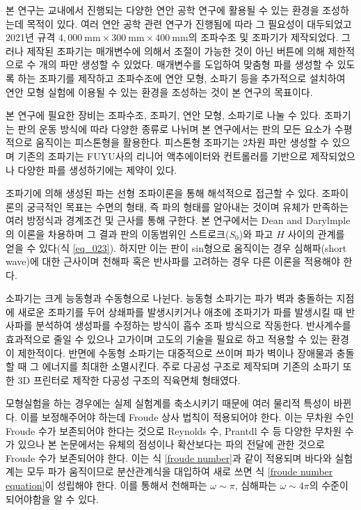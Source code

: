 \begin{summary}
    본 연구는 교내에서 진행되는 다양한 연안 공학 연구에 활용될 수 있는 환경을 조성하는데 목적이 있다. 여러 연안 공학 관련 연구가 진행됨에 따라 그 필요성이 대두되었고 2021년 규격 $4,000\mathrm{~mm}\times300\mathrm{~mm}\times400\mathrm{~mm}$의 조파수조 및 조파기가 제작되었다. 그러나 제작된 조파기는 매개변수에 의해서 조절이 가능한 것이 아닌 버튼에 의해 제한적으로 수 개의 파만 생성할 수 있었다. 매개변수를 도입하여 맞춤형 파를 생성할 수 있도록 하는 조파기를 제작하고 조파수조에 연안 모형, 소파기 등을 추가적으로 설치하여 연안 모형 실험에 이용될 수 있는 환경을 조성하는 것이 본 연구의 목표이다.

    본 연구에 필요한 장비는 조파수조, 조파기, 연안 모형, 소파기로 나눌 수 있다. 조파기는 판의 운동 방식에 따라 다양한 종류로 나뉘며 본 연구에서는 판의 모든 요소가 수평적으로 움직이는 피스톤형을 활용한다. 피스톤형 조파기는 2차원 파만 생성할 수 있으며 기존의 조파기는 FUYU사의 리니어 액추에이터와 컨트롤러를 기반으로 제작되었으나 다양한 파를 생성하기에는 제약이 있다.

    조파기에 의해 생성된 파는 선형 조파이론을 통해 해석적으로 접근할 수 있다. 조파이론의 궁극적인 목표는 수면의 형태, 즉 파의 형태를 알아내는 것이며 유체가 만족하는 여러 방정식과 경계조건 및 근사를 통해 구한다. 본 연구에서는 Dean and Darylmple의 이론을 차용하며 그 결과 판의 이동범위인 스트로크($S_{0}$)와 파고 $H$ 사이의 관계를 얻을 수 있다(식 \ref{eq_023}). 하지만 이는 판이 sin형으로 움직이는 경우 심해파(short wave)에 대한 근사이며 천해파 혹은 반사파를 고려하는 경우 다른 이론을 적용해야 한다.

    소파기는 크게 능동형과 수동형으로 나뉜다. 능동형 소파기는 파가 벽과 충돌하는 지점에 새로운 조파기를 두어 상쇄파를 발생시키거나 애초에 조파기가 파를 발생시킬 때 반사파를 분석하여 생성파를 수정하는 방식이 흡수 조파 방식으로 작동한다. 반사계수를 효과적으로 줄일 수 있으나 고가이며 고도의 기술을 필요로 하고 적용할 수 있는 환경이 제한적이다. 반면에 수동형 소파기는 대중적으로 쓰이며 파가 벽이나 장애물과 충돌할 때 그 에너지를 최대한 소멸시킨다. 주로 다공성 구조로 제작되며 기존의 소파기 또한 3D 프린터로 제작한 다공성 구조의 직육면체 형태였다.

    모형실험을 하는 경우에는 실제 실험계를 축소시키기 때문에 여러 물리적 특성이 바뀐다. 이를 보정해주어야 하는데 Froude 상사 법칙이 적용되어야 한다. 이는 무차원 수인 Froude 수가 보존되어야 한다는 것으로 Reynolds 수, Prantdl 수 등 다양한 무차원 수가 있으나 본 논문에서는 유체의 점성이나 확산보다는 파의 전달에 관한 것으로 Froude 수가 보존되어야 한다. 이는 식 \ref{froude number}과 같이 적용되며 바다와 실험계는 모두 파가 움직이므로 분산관계식을 대입하여 새로 쓰면 식 \ref{froude number equation}이 성립해야 한다. 이를 통해서 천해파는 $\omega \sim \pi$, 심해파는 $\omega \sim 4\pi$의 수준이 되어야함을 알 수 있다.


\end{summary}
